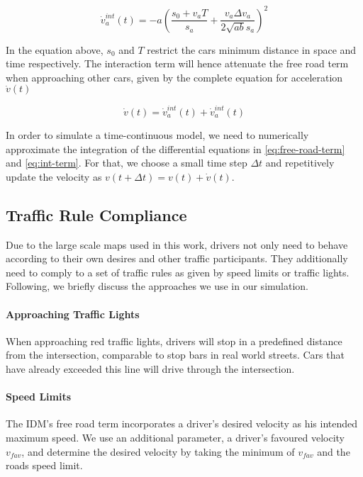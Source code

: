 \documentclass[10pt]{article}
\begin{document}
\begin{equation}
	\label{eq:int-term}
	\dot{v}_a^{int}(t) = - a ( \frac{s_0 + v_a T}{s_a} + \frac{v_a \Delta v_a}{2 \sqrt{ab} s_a} )^2
\end{equation}

In the equation above, $s_0$ and $T$ restrict the cars minimum distance in space and time respectively. The interaction term will hence attenuate the free road term when approaching other cars, given by the complete equation for acceleration $\dot{v}(t)$

\begin{equation}
	\dot{v}(t) = \dot{v}_a^{int}(t) + \dot{v}_a^{int}(t)
\end{equation}

In order to simulate a time-continuous model, we need to numerically approximate the integration of the differential equations in \ref{eq:free-road-term} and \ref{eq:int-term}. For that, we choose a small time step $\Delta t$ and repetitively update the velocity as $v(t + \Delta t) = v(t) + \dot{v}(t)$.

\subsection{Traffic Rule Compliance}
Due to the large scale maps used in this work, drivers not only need to behave according to their own desires and other traffic participants. They additionally need to comply to a set of traffic rules as given by speed limits or traffic lights. Following, we briefly discuss the approaches we use in our simulation.

\paragraph{Approaching Traffic Lights} When approaching red traffic lights, drivers will stop in a predefined distance from the intersection, comparable to stop bars in real world streets. Cars that have already exceeded this line will drive through the intersection. 

\paragraph{Speed Limits} The IDM's free road term incorporates a driver's desired velocity as his intended maximum speed. We use an additional parameter, a driver's favoured velocity $v_{fav}$, and determine the desired velocity by taking the minimum of $v_{fav}$ and the roads speed limit.
\end{document}
